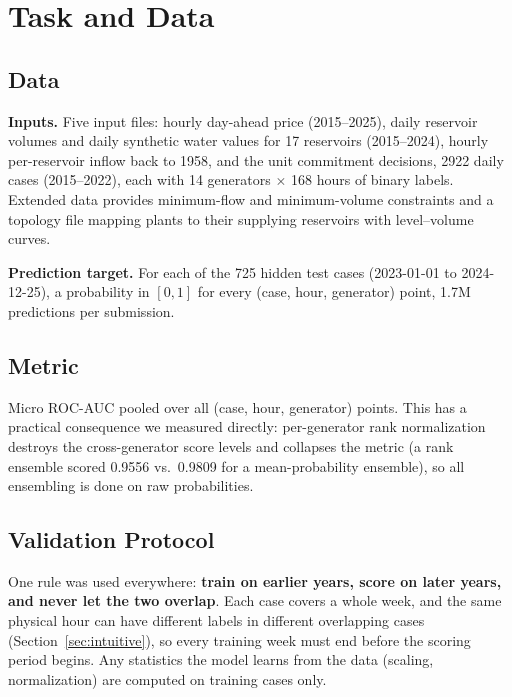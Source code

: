 \documentclass{article}
\begin{document}
\section{Task and Data}

\subsection{Data}
\textbf{Inputs.} Five input files: hourly day-ahead price (2015--2025),
daily reservoir volumes and daily synthetic water values for 17 reservoirs
(2015--2024), hourly per-reservoir inflow back to 1958, and the unit
commitment decisions, 2922 daily cases (2015--2022), each with 14
generators $\times$ 168 hours of binary labels. Extended data provides
minimum-flow and minimum-volume constraints and a topology file mapping
plants to their supplying reservoirs with level--volume curves.

\textbf{Prediction target.} For each of the 725 hidden test cases
(2023-01-01 to 2024-12-25), a probability in $[0,1]$ for every
(case, hour, generator) point, 1.7M predictions per submission.

\subsection{Metric}
\label{sec:metric}
Micro ROC-AUC pooled over all (case, hour, generator) points. This has a
practical consequence we measured directly: per-generator rank
normalization destroys the cross-generator score levels and collapses the
metric (a rank ensemble scored 0.9556 vs.\ 0.9809 for a mean-probability
ensemble), so all ensembling is done on raw probabilities.

\subsection{Validation Protocol}
One rule was used everywhere: \textbf{train on earlier years, score on
later years, and never let the two overlap}. Each case covers a whole
week, and the same physical hour can have different labels in different
overlapping cases (Section~\ref{sec:intuitive}), so every training week
must end before the scoring period begins. Any statistics the model learns
from the data (scaling, normalization) are computed on training cases
only.
\end{document}
